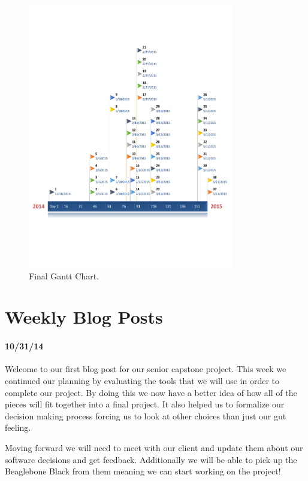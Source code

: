 \documentclass[letterpaper,10pt,titlepage]{article}
\begin{document}
\begin{figure}[H]
    \centering
    \includegraphics[width=0.8\textwidth]{ganttafter.pdf}
    \caption{Final Gantt Chart.}
\end{figure}

\section*{Weekly Blog Posts}
    \paragraph*{10/31/14}
    Welcome to our first blog post for our senior capstone project. This week
    we continued our planning by evaluating the tools that we will use in order
    to complete our project. By doing this we now have a better idea of how all
    of the pieces will fit together into a final project. It also helped us to
    formalize our decision making process forcing us to look at other choices
    than just our gut feeling.

    Moving forward we will need to meet with our client and update them about 
    our software decisions and get feedback. Additionally we will be able to 
    pick up the Beaglebone Black from them meaning we can start working on the
    project!
\end{document}
